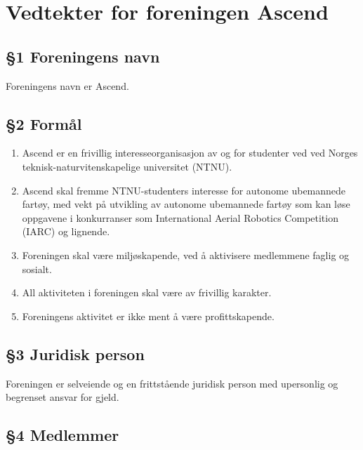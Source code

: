 \documentclass[a4paper,11pt,titlepage]{article}
\newcommand{\orgName}{Ascend}
\begin{document}
\section*{Vedtekter for foreningen Ascend}

\subsection*{§1 Foreningens navn}
Foreningens navn er \orgName.

\subsection*{§2 Formål}

\begin{enumerate}
\item {\orgName} er en frivillig interesseorganisasjon av og for studenter ved ved Norges teknisk-naturvitenskapelige universitet (NTNU).
\item {\orgName} skal fremme NTNU-studenters interesse for autonome ubemannede fartøy, med vekt på utvikling av autonome ubemannede fartøy som kan løse oppgavene i konkurranser som International Aerial Robotics Competition (IARC) og lignende.
\item Foreningen skal være miljøskapende, ved å aktivisere medlemmene faglig og sosialt.
\item All aktiviteten i foreningen skal være av frivillig karakter.
\item Foreningens aktivitet er ikke ment å være profittskapende.
\end{enumerate}

\subsection*{§3 Juridisk person}
Foreningen er selveiende og en frittstående juridisk person med upersonlig og begrenset ansvar for gjeld.

\subsection*{§4 Medlemmer}
\end{document}
